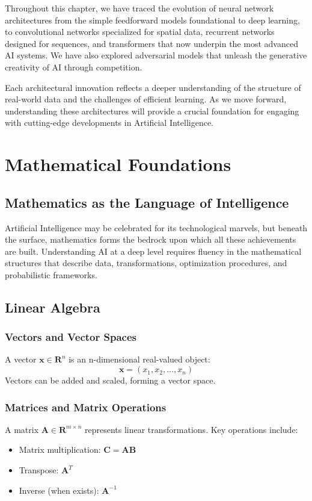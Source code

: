 \documentclass[openany]{book}
\begin{document}
Throughout this chapter, we have traced the evolution of neural network 
architectures from the simple feedforward models foundational to deep learning, 
to convolutional networks specialized for spatial data, recurrent networks 
designed for sequences, and transformers that now underpin the most advanced AI 
systems. We have also explored adversarial models that unleash the generative 
creativity of AI through competition.

Each architectural innovation reflects a deeper understanding of the structure 
of real-world data and the challenges of efficient learning. As we move forward, 
understanding these architectures will provide a crucial foundation for engaging 
with cutting-edge developments in Artificial Intelligence.

\chapter{Mathematical Foundations}

\section{Mathematics as the Language of Intelligence}

Artificial Intelligence may be celebrated for its technological marvels, but 
beneath the surface, mathematics forms the bedrock upon which all these 
achievements are built. Understanding AI at a deep level requires fluency in the 
mathematical structures that describe data, transformations, optimization 
procedures, and probabilistic frameworks.

\section{Linear Algebra}

\subsection{Vectors and Vector Spaces}
A vector $\mathbf{x} \in \mathbf{R}^n$ is an n-dimensional real-valued object:
\[
\mathbf{x} = (x_1, x_2, \ldots, x_n)
\]
Vectors can be added and scaled, forming a vector space.

\subsection{Matrices and Matrix Operations}
A matrix $\mathbf{A} \in \mathbf{R}^{m \times n}$ represents linear 
transformations. Key operations include:
\begin{itemize}
    \item Matrix multiplication: $\mathbf{C} = \mathbf{AB}$
    \item Transpose: $\mathbf{A}^T$
    \item Inverse (when exists): $\mathbf{A}^{-1}$
\end{itemize}
\end{document}
